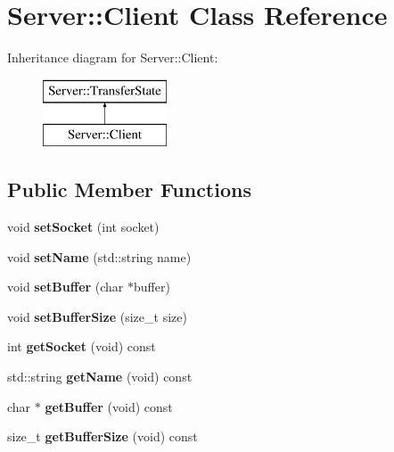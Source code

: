 \hypertarget{classServer_1_1Client}{}\section{Server\+:\+:Client Class Reference}
\label{classServer_1_1Client}
Inheritance diagram for Server\+:\+:Client\+:\begin{figure}[H]
\begin{center}
\leavevmode
\includegraphics[height=2.000000cm]{d0/d83/classServer_1_1Client}
\end{center}
\end{figure}
\subsection*{Public Member Functions}
\begin{DoxyCompactItemize}
\item 
\mbox{\label{classServer_1_1Client_a74afeebe359017e691d4248f911623f1}} 
void {\bfseries set\+Socket} (int socket)
\item 
\mbox{\label{classServer_1_1Client_a33e215909713741a1c30779f34e79347}} 
void {\bfseries set\+Name} (std\+::string name)
\item 
\mbox{\label{classServer_1_1Client_a2f41160cbf531ab103194b4cfb52ac47}} 
void {\bfseries set\+Buffer} (char $\ast$buffer)
\item 
\mbox{\label{classServer_1_1Client_aeb1de2999e746bf4f7903be65f506c76}} 
void {\bfseries set\+Buffer\+Size} (size\+\_\+t size)
\item 
\mbox{\label{classServer_1_1Client_a5ce358642236eec87c9341b237f13abf}} 
int {\bfseries get\+Socket} (void) const
\item 
\mbox{\label{classServer_1_1Client_abe94d5c1ba28b59c9bb2ae2b21db604c}} 
std\+::string {\bfseries get\+Name} (void) const
\item 
\mbox{\label{classServer_1_1Client_a704bbc5b3c3369b050347c92258d9645}} 
char $\ast$ {\bfseries get\+Buffer} (void) const
\item 
\mbox{\label{classServer_1_1Client_a52da823e58029630fa222783ae13d715}} 
size\+\_\+t {\bfseries get\+Buffer\+Size} (void) const
\end{DoxyCompactItemize}
